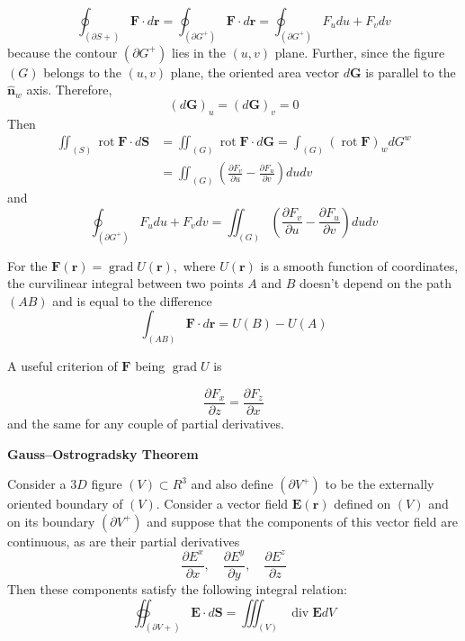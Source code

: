 $$
\oint_{(\partial S+)} \mathbf{F} \cdot d \mathbf{r}=\oint_{\left(\partial G^{+}\right)} \mathbf{F} \cdot d \mathbf{r}=\oint_{\left(\partial G^{+}\right)} F_{u} d u+F_{v} d v
$$
because the contour $\left(\partial G^{+}\right)$ lies in the $(u, v)$ plane. Further, since the figure $(G)$ belongs to the $(u, v)$ plane, the oriented area vector $d \mathbf{G}$ is parallel to the $\hat{\mathbf{n}}_{w}$ axis. Therefore, 
$$
(d \mathbf{G})_{u}=\left(d \mathbf{G}\right)_{v}=0
$$
Then
\begin{equation}
\begin{aligned}
\iint_{(S)} \operatorname{rot} \mathbf{F} \cdot d \mathbf{S} &=\iint_{(G)} \operatorname{rot} \mathbf{F} \cdot d \mathbf{G}=\int_{(G)}(\operatorname{rot} \mathbf{F})_{w} d G^{w} \\
&=\iint_{(G)}\left(\frac{\partial F_{v}}{\partial u}-\frac{\partial F_{u}}{\partial v}\right) d u d v
\end{aligned}
\end{equation}
and
\begin{equation}
\oint_{\left(\partial G^{+}\right)} F_{u} d u+F_{v} d v=\iint_{(G)}\left(\frac{\partial F_{v}}{\partial u}-\frac{\partial F_{u}}{\partial v}\right) d u d v
\end{equation}
\begin{thm}
 For the $\mathbf{F}(\mathbf{r})=\operatorname{grad} U(\mathbf{r}),$ where $U(\mathbf{r})$ is a smooth function of coordinates, the curvilinear integral between two points $A$ and $B$ doesn't depend on the path $(A B)$ and is equal to the difference
 \begin{equation}
\int_{(A B)} \mathbf{F} \cdot d \mathbf{r}=U(B)-U(A)
\end{equation}
\end{thm}
A useful criterion of $\mathbf{F}$ being $\operatorname{grad} U$ is
\begin{qt}
\begin{equation}
\frac{\partial F_{x}}{\partial z}=\frac{\partial F_{z}}{\partial x}
\end{equation}
and the same for any couple of partial derivatives.
\end{qt}
\begin{thm}
 \textbf{Gauss–Ostrogradsky Theorem}
 
 Consider a $3 D$ figure $(V) \subset R^{3}$ and also define $\left(\partial V^{+}\right)$ to be the externally oriented boundary of $(V) .$ Consider a vector field $\mathbf{E}(\mathbf{r})$ defined on $(V)$ and on its boundary $\left(\partial V^{+}\right)$ and suppose that the components of this vector field are continuous, as are their partial derivatives
 $$
\frac{\partial E^{x}}{\partial x}, \quad \frac{\partial E^{y}}{\partial y}, \quad \frac{\partial E^{z}}{\partial z}
$$
Then these components satisfy the following integral relation:
\begin{equation}
\oiint_{(\partial V+)} \mathbf{E} \cdot d \mathbf{S}=\iiint_{(V)} \operatorname{div} \mathbf{E} d V
\end{equation}
\end{thm}